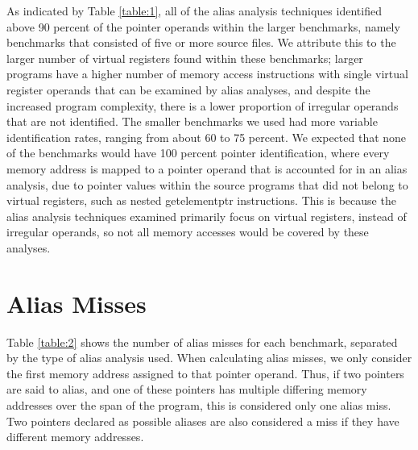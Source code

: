 As indicated by Table \ref{table:1}, all of the alias analysis techniques identified above 90 percent of the pointer operands within the larger benchmarks, namely benchmarks that consisted of five or more source files. We attribute this to the larger number of virtual registers found within these benchmarks; larger programs have a higher number of memory access instructions with single virtual register operands that can be examined by alias analyses, and despite the increased program complexity, there is a lower proportion of irregular operands that are not identified. The smaller benchmarks we used had more variable identification rates, ranging from about 60 to 75 percent. We expected that none of the benchmarks would have 100 percent pointer identification, where every memory address is mapped to a pointer operand that is accounted for in an alias analysis, due to pointer values within the source programs that did not belong to virtual registers, such as nested getelementptr instructions. This is because the alias analysis techniques examined primarily focus on virtual registers, instead of irregular operands, so not all memory accesses would be covered by these analyses.

\section{Alias Misses}
Table \ref{table:2} shows the number of alias misses for each benchmark, separated by the type of alias analysis used. When calculating alias misses, we only consider the first memory address assigned to that pointer operand. Thus, if two pointers are said to alias, and one of these pointers has multiple differing memory addresses over the span of the program, this is considered only one alias miss. Two pointers declared as possible aliases are also considered a miss if they have different memory addresses.

